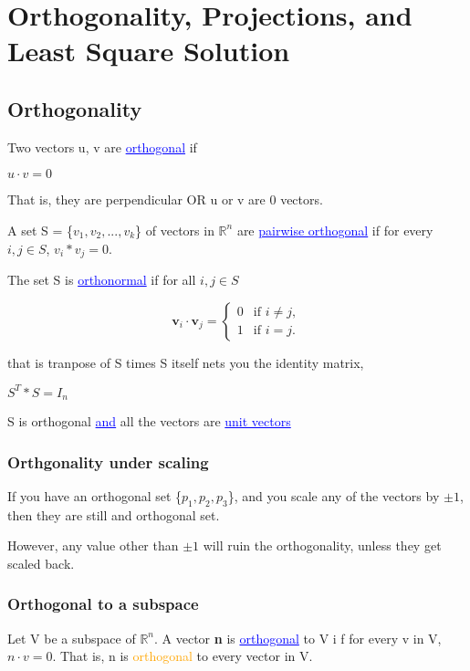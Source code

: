 \documentclass{article}
\newcommand{\bul}[1]{\textcolor{blue}{\underline{#1}}}
\newcommand{\sbreak}{\vspace{10pt}}
\begin{document}
\section{Orthogonality, Projections, and Least Square Solution}
\subsection{Orthogonality}
Two vectors u, v are \bul{orthogonal} if
\begin{center}
    $u \cdot v=0$
\end{center}
That is, they are perpendicular OR u or v are 0 vectors.

\sbreak

A set S = \{$v_1,v_2,...,v_k$\} of vectors in $\mathbb{R}^n$ are \bul{pairwise orthogonal} if for every $i,j\in S$, $v_i*v_j=0$.

\sbreak

The set S is \bul{orthonormal} if for all $i,j \in S$
\begin{center}
    \[
    \mathbf{v}_i \cdot \mathbf{v}_j = \begin{cases} 
        0 & \text{if } i \neq j, \\
        1 & \text{if } i = j.
     \end{cases}
     \]
\end{center}

that is tranpose of S times S itself nets you the identity matrix,

\begin{center}
    $S^T * S = I_n$
\end{center}
S is orthogonal \bul{and} all the vectors are \bul{unit vectors}

\subsubsection{Orthgonality under scaling}
If you have an orthogonal set \{$p_1, p_2, p_3$\}, and you scale any of the vectors by $\pm 1$, then they are still and orthogonal set.

\sbreak

However, any value other than $\pm 1$ will ruin the orthogonality, unless they get scaled back.

\subsubsection{Orthogonal to a subspace}
Let V be a subspace of $\mathbb{R}^n$. A vector \textbf{n} is \bul{orthogonal} to V i f for every v in V, $n\cdot v = 0$. That is, n is \textcolor{orange}{orthogonal} to every vector in V.
\end{document}
